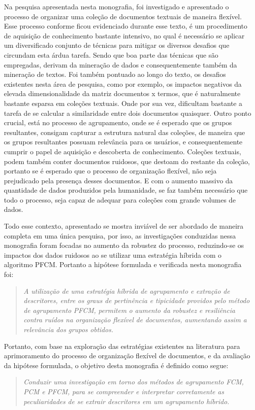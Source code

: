 Na pesquisa apresentada nesta monografia, foi investigado e apresentado o processo de organizar
uma coleção de documentos textuais de maneira flexível. Esse processo conforme ficou evidenciado
durante esse texto, é um procedimento de aquisição de conhecimento bastante intensivo, no qual é
necessário se aplicar um diversificado conjunto de técnicas para mitigar os diversos desafios que
circundam esta árdua tarefa. Sendo que boa parte das técnicas que são empregadas, derivam da
mineração de dados e consequentemente também da mineração de textos. Foi também pontuado ao longo do
texto, os desafios existentes nesta área de pesquisa, como por exemplo, os impactos negativos da
elevada dimensionalidade da matriz documentos x termos, que é naturalmente bastante esparsa em
coleções textuais. Onde por sua vez, dificultam bastante a tarefa de se calcular a similaridade
entre dois documentos quaisquer. Outro ponto crucial, está no processo de agrupamento, onde se é
esperado que os grupos resultantes, consigam capturar a estrutura natural das coleções, de maneira
que os grupos resultantes possuam relevância para os usuários, e consequentemente cumprir o papel
de aquisição e descoberta de conhecimento. Coleções textuais, podem também conter documentos
ruidosos, que destoam do restante da coleção, portanto se é esperado que o processo de organização
flexível, não seja prejudicado pela presença desses documentos. E com o aumento massivo da
quantidade de dados produzidos pela humanidade, se faz também necessário que todo o processo, seja
capaz de adequar para coleções com grande volumes de dados.

Todo esse contexto, apresentado se mostra inviável de ser abordado de maneira completa em uma única
pesquisa, por isso, as investigações conduzidas nessa monografia foram focadas no aumento da
robustez do processo, reduzindo-se os impactos dos dados ruidosos ao se utilizar uma estratégia
híbrida com o algoritmo PFCM. Portanto a hipótese formulada e verificada nesta monografia foi:

\begin{quote}
\textit{A utilização de uma estratégia híbrida de agrupamento e extração de descritores, entre os 
  graus de pertinência e tipicidade providos pelo método de agrupamento PFCM, permitem o aumento da
    robustez e resiliência contra ruídos na organização flexível de documentos, aumentando assim a
    relevância dos grupos obtidos.}
\end{quote}

Portanto, com base na exploração das estratégias existentes na literatura para aprimoramento do
processo de organização flexível de documentos, e da avaliação da hipótese formulada, o objetivo
desta monografia é definido como segue:

\begin{quote}
\textit{Conduzir uma investigação em torno dos métodos de agrupamento FCM, PCM e PFCM, para
se compreender e interpretar corretamente as peculiaridades de se extrair descritores em um
agrupamento híbrido.}
\end{quote}
